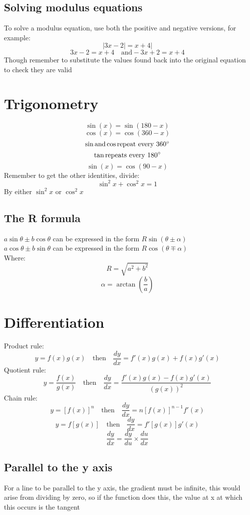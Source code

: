 \documentclass{article}[18pt]
\begin{document}
\subsection{Solving modulus equations}
To solve a modulus equation, use both the positive and negative versions, for example:
$$|3x-2|=x+4|$$
$$3x-2=x+4 \quad \textrm{and} -3x+2=x+4$$
Though remember to substitute the values found back into the original equation to check they are valid
\section{Trigonometry}
$$\sin(x)=\sin(180-x)$$
$$\cos(x)=\cos(360-x)$$
$$\sin \textrm{and} \cos \textrm{repeat every 360}\degree$$
$$\tan \textrm{repeats every 180}\degree$$
$$\sin(x)=\cos(90-x)$$
Remember to get the other identities, divide:
$$\sin^2x+\cos^2x=1$$
By either $\sin^2x$ or $\cos^2x$
\subsection{The R formula}
$a\sin\theta\pm b\cos\theta$ can be expressed in the form $R\sin(\theta\pm\alpha)$\\
$a\cos\theta\pm b\sin\theta$ can be expressed in the form $R\cos(\theta\mp\alpha)$\\
Where: 
$$R = \sqrt{a^2+b^2}$$
$$\alpha=\arctan(\frac{b}{a})$$
\newpage
\section{Differentiation}
Product rule:
$$y=f(x)g(x)\quad \textrm{then} \quad\frac{dy}{dx}=f'(x)g(x)+f(x)g'(x)$$
Quotient rule:
$$y=\frac{f(x)}{g(x)} \quad \textrm{then} \quad\frac{dy}{dx}=\frac{f'(x)g(x)-f(x)g'(x)}{(g(x))^2}$$
Chain rule:
$$y=[f(x)]^n \quad \textrm{then} \quad \frac{dy}{dx}=n[f(x)]^{n-1}f'(x)$$
$$y=f[g(x)] \quad \textrm{then} \quad \frac{dy}{dx}=f'[g(x)]g'(x)$$
$$\frac{dy}{dx}=\frac{dy}{du}\times\frac{du}{dx}$$
\subsection{Parallel to the y axis}
For a line to be parallel to the y axis, the gradient must be infinite, this would arise from dividing by zero, so if the function does this, the value at x at which this occurs is the tangent
\end{document}
